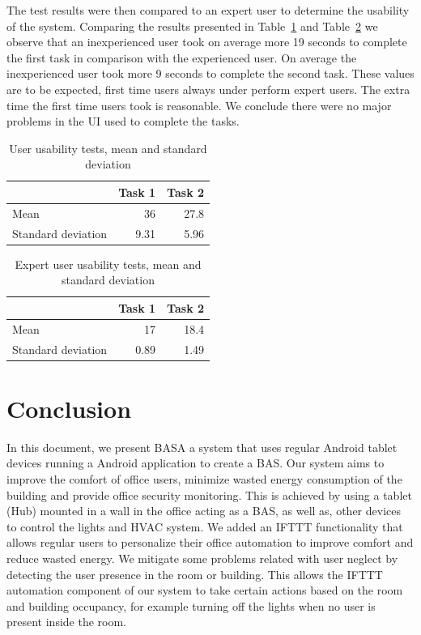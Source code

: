 \documentclass[conference]{IEEEtran}
\begin{document}
The test results were then compared to an expert user to determine the usability of the system. Comparing the results presented in Table~\ref{eval:automation2} and Table~\ref{eval:automation3} we observe that an inexperienced user took on average more 19 seconds to complete the first task in comparison with the experienced user. On average the inexperienced user took more 9 seconds to complete the second task. These values are to be expected, first time users always under perform expert users. The extra time the first time users took is reasonable. We conclude there were no major problems in the \ac{UI} used to complete the tasks.

\begin{table}[h]
\centering
\begin{tabular}{l|r|r|}
\cline{2-3}
 & \multicolumn{1}{l|}{Task 1} & \multicolumn{1}{l|}{Task 2} \\ \hline
\multicolumn{1}{|l|}{Mean} & 36 & 27.8 \\ \hline
\multicolumn{1}{|l|}{Standard deviation} & 9.31 & 5.96 \\ \hline
\end{tabular}
\caption{User usability tests, mean and standard deviation}
\label{eval:automation2}
\end{table}


\begin{table}[h]
\centering
\begin{tabular}{l|r|r|}
\cline{2-3}
 & \multicolumn{1}{l|}{Task 1} & \multicolumn{1}{l|}{Task 2} \\ \hline
\multicolumn{1}{|l|}{Mean} & 17 & 18.4 \\ \hline
\multicolumn{1}{|l|}{Standard deviation} & 0.89 & 1.49 \\ \hline
\end{tabular}
\caption{Expert user usability tests, mean and standard deviation}
\label{eval:automation3}
\end{table}



\section*{Conclusion}

In this document, we present BASA a system that uses regular Android tablet devices running a Android application to create a \ac{BAS}. Our system aims to improve the comfort of office users, minimize wasted energy consumption of the building and provide office security monitoring. 
This is achieved by using a tablet (Hub) mounted in a wall in the office acting as a \ac{BAS}, as well as, other devices to control the lights and \ac{HVAC} system. 
We added an \ac{IFTTT} functionality that allows regular users to personalize their office automation to improve comfort and reduce wasted energy. We mitigate some problems related with user neglect by detecting the user presence in the room or building. This allows the \ac{IFTTT} automation component of our system to take certain actions based on the room and building occupancy, for example turning off the lights when no user is present inside the room.
\end{document}

